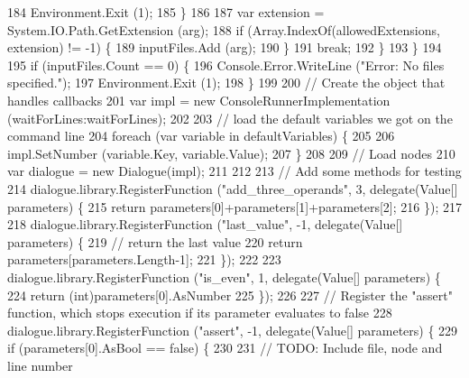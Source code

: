 \begin{DoxyCode}
184                         Environment.Exit (1);
185                     \}
186 
187                     var extension = System.IO.Path.GetExtension (arg);
188                     \textcolor{keywordflow}{if} (Array.IndexOf(allowedExtensions, extension) != -1) \{
189                         inputFiles.Add (arg);
190                     \}
191                     \textcolor{keywordflow}{break};
192                 \}
193             \}
194 
195             \textcolor{keywordflow}{if} (inputFiles.Count == 0) \{
196                 Console.Error.WriteLine (\textcolor{stringliteral}{"Error: No files specified."});
197                 Environment.Exit (1);
198             \}
199 
200             \textcolor{comment}{// Create the object that handles callbacks}
201             var impl = \textcolor{keyword}{new} ConsoleRunnerImplementation (waitForLines:waitForLines);
202 
203             \textcolor{comment}{// load the default variables we got on the command line}
204             \textcolor{keywordflow}{foreach} (var variable \textcolor{keywordflow}{in} defaultVariables) \{
205 
206                 impl.SetNumber (variable.Key, variable.Value);
207             \}
208 
209             \textcolor{comment}{// Load nodes}
210             var dialogue = \textcolor{keyword}{new} Dialogue(impl);
211 
212 
213             \textcolor{comment}{// Add some methods for testing}
214             dialogue.library.RegisterFunction (\textcolor{stringliteral}{"add\_three\_operands"}, 3, delegate(Value[] parameters) \{
215                 \textcolor{keywordflow}{return} parameters[0]+parameters[1]+parameters[2];
216             \});
217 
218             dialogue.library.RegisterFunction (\textcolor{stringliteral}{"last\_value"}, -1, delegate(Value[] parameters) \{
219                 \textcolor{comment}{// return the last value}
220                 \textcolor{keywordflow}{return} parameters[parameters.Length-1];
221             \});
222 
223             dialogue.library.RegisterFunction (\textcolor{stringliteral}{"is\_even"}, 1, delegate(Value[] parameters) \{
224                 \textcolor{keywordflow}{return} (\textcolor{keywordtype}{int})parameters[0].AsNumber %
225             \});
226 
227             \textcolor{comment}{// Register the "assert" function, which stops execution if its parameter evaluates to false}
228             dialogue.library.RegisterFunction (\textcolor{stringliteral}{"assert"}, -1, delegate(Value[] parameters) \{
229                 \textcolor{keywordflow}{if} (parameters[0].AsBool == \textcolor{keyword}{false}) \{
230 
231                     \textcolor{comment}{// TODO: Include file, node and line number}

\end{DoxyCode}
